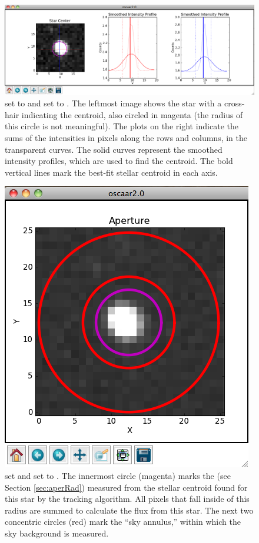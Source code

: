 \documentclass[a4paper]{article}
\begin{document}
\begin{figure}[h]
\begin{center}
\includegraphics[scale=0.25]{imgs/trackPlots.png}
\caption{ set to  and  set to . The leftmost image shows the star with a cross-hair indicating the centroid, also circled in magenta (the radius of this circle is not meaningful). The plots on the right indicate the sums of the intensities in pixels along the rows and columns, in the transparent curves. The solid curves represent the smoothed intensity profiles, which are used to find the centroid. The bold vertical lines mark the best-fit stellar centroid in each axis.}
\label{fig:trackingExamples}
\end{center}	
\end{figure}

\begin{figure}[h]
\begin{center}
\includegraphics[scale=0.25]{imgs/aperPlots.png}
\caption{ set  and  set to . The innermost circle (magenta) marks the  (see Section \ref{sec:aperRad}) measured from the stellar centroid found for this star by the tracking algorithm. All pixels that fall inside of this radius are summed to calculate the flux from this star. The next two concentric circles (red) mark the ``sky annulus,'' within which the sky background is measured.  }
\label{fig:photPlots}
\end{center}	
\end{figure}
\end{document}
